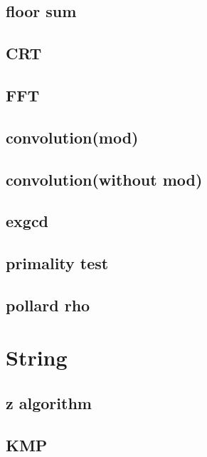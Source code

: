 \subsection{floor sum}

\subsection{CRT}

\subsection{FFT}

\subsection{convolution(mod)}

\subsection{convolution(without mod)}

\subsection{exgcd}

\subsection{primality test}

\subsection{pollard rho}


\section{String}
\subsection{z algorithm}

\subsection{KMP}

